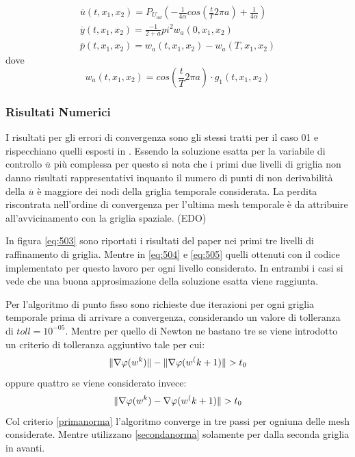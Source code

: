 {\renewcommand\arraystretch{2}
\begin{equation}
\begin{array}{c}
\overline{u}(t,x_1,x_2) = P_{U_{ad}} \left( -\frac{1}{4\alpha}cos \left( \frac{t}{T}2{\pi}a \right) +\frac{1}{4\alpha} \right) \\
\overline{y}(t,x_1,x_2) = \frac{- 1}{2 + a}{pi}^2w_a(0,x_1,x_2) \\
\overline{p}(t,x_1,x_2) = w_a(t,x_1,x_2) - w_a(T,x_1,x_2)
\end{array}
\label{eq:507}
\end{equation}
}
dove
\begin{equation}
w_a(t,x_1,x_2) = cos \left( \frac{t}{T}2{\pi}a \right) \cdot g_1(t,x_1,x_2)
\label{eq:508}
\end{equation}

\subsubsection{Risultati Numerici}
I risultati per gli errori di convergenza sono gli stessi tratti per il caso 01 e rispecchiano quelli esposti in \cite{MAIN}. Essendo la soluzione esatta per la variabile di controllo $\overline{u}$ più complessa per questo si nota che i primi due livelli di griglia non danno risultati rappresentativi inquanto il numero di punti di non derivabilità della $\overline{u}$ è maggiore dei nodi della griglia temporale considerata.
La perdita riscontrata nell'ordine di convergenza per l'ultima mesh temporale è da attribuire all'avvicinamento con la griglia spaziale. (EDO)
\par
In figura \ref{eq:503} sono riportati i risultati del paper \cite{MAIN} nei primi tre livelli di raffinamento di griglia. Mentre in \ref{eq:504} e \ref{eq:505} quelli ottenuti con il codice implementato per questo lavoro per ogni livello considerato. In entrambi i casi si vede che una buona approsimazione della soluzione esatta viene raggiunta.
\par
Per l'algoritmo di punto fisso sono richieste due iterazioni per ogni griglia temporale prima di arrivare a convergenza, considerando un valore di tolleranza di $toll=10^{-05}$. Mentre per quello di Newton ne bastano tre se viene introdotto un criterio di tolleranza aggiuntivo tale per cui:
\begin{equation}
\lVert\nabla\varphi(w^k)\rVert - \lVert\nabla\varphi(w^(k+1)\rVert > t_0
\label{primanorma}
\end{equation} 
oppure quattro se viene considerato invece:
\begin{equation}
\lVert\nabla\varphi(w^k) - \nabla\varphi(w^(k+1)\rVert > t_0
\label{secondanorma}
\end{equation}
Col criterio \ref{primanorma} l'algoritmo converge in tre passi per ogniuna delle mesh considerate. Mentre utilizzano \ref{secondanorma} solamente per dalla seconda griglia in avanti.


